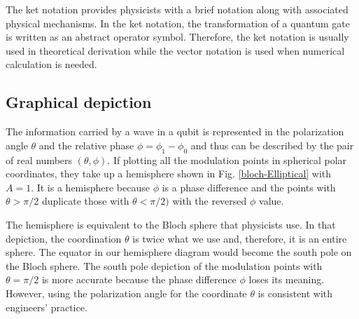 \documentclass[oneside, letter, 12pt]{book}
\begin{document}
The ket notation provides physicists with a brief notation along with associated physical mechanisms. In the ket notation, the transformation of a quantum gate is written as an abstract operator symbol. Therefore, the ket notation is usually used in theoretical derivation while the vector notation is used when numerical calculation is needed.

\subsection{Graphical depiction}
The information carried by a wave in a qubit is represented in the polarization angle $\theta$ and the relative phase $\phi = \phi_1 - \phi_0$ and thus can be described by the pair of real numbers $(\theta, \phi)$. If plotting all the modulation points in spherical polar coordinates, they take up a hemisphere shown in Fig. \ref{bloch-Elliptical} with $A=1$. It is a hemisphere because $\phi$ is a phase difference and the points with $\theta > \pi /2$ duplicate those with $\theta < \pi /2)$ with the reversed $\phi$ value.

The hemisphere is equivalent to the Bloch sphere that physicists use. In that depiction, the coordination $\theta$ is twice what we use and, therefore, it is an entire sphere. The equator in our hemisphere diagram would become the south pole on the Bloch sphere. The south pole depiction of the modulation points with $\theta=\pi /2$ is more accurate because the phase difference $\phi$ loses its meaning. However, using the polarization angle for the coordinate $\theta$ is consistent with engineers' practice.
\end{document}
